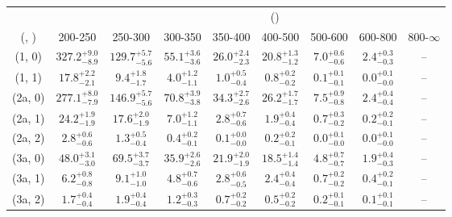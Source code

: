 \begin{table}[h!]
\tiny
\centering
{}
\begin{tabular}
{ccccccccc}
	\hline\hline
&	& \multicolumn{8}{c}{\scalht (\gev)} \\ 
	 (\njet,  \nb) & 200-250 & 250-300 & 300-350 & 350-400 & 400-500 & 500-600 & 600-800 & 800-$\infty$ \\ [0.8ex] 
\hline
	(1, 0) & $327.2^{+ 9.0 }_{- 8.9 }$ & $129.7^{+ 5.7 }_{- 5.6 }$ & $55.1^{+ 3.6 }_{- 3.6 }$ & $26.0^{+ 2.4 }_{- 2.3 }$ & $20.8^{+ 1.3 }_{- 1.2 }$ & $7.0^{+ 0.6 }_{- 0.6 }$ & $2.4^{+ 0.3 }_{- 0.3 }$ & -- \\[0.5ex] 
	(1, 1) & $17.8^{+ 2.2 }_{- 2.1 }$ & $9.4^{+ 1.8 }_{- 1.7 }$ & $4.0^{+ 1.2 }_{- 1.1 }$ & $1.0^{+ 0.5 }_{- 0.4 }$ & $0.8^{+ 0.2 }_{- 0.2 }$ & $0.1^{+ 0.1 }_{- 0.1 }$ & $0.0^{+ 0.1 }_{- 0.0 }$ & -- \\[0.5ex] 
	(2a, 0) & $277.1^{+ 8.0 }_{- 7.9 }$ & $146.9^{+ 5.7 }_{- 5.6 }$ & $70.8^{+ 3.9 }_{- 3.8 }$ & $34.3^{+ 2.7 }_{- 2.6 }$ & $26.2^{+ 1.7 }_{- 1.7 }$ & $7.5^{+ 0.9 }_{- 0.8 }$ & $2.4^{+ 0.4 }_{- 0.4 }$ & -- \\[0.5ex] 
	(2a, 1) & $24.2^{+ 1.9 }_{- 1.9 }$ & $17.6^{+ 2.0 }_{- 1.9 }$ & $7.0^{+ 1.2 }_{- 1.1 }$ & $2.8^{+ 0.7 }_{- 0.6 }$ & $1.9^{+ 0.4 }_{- 0.4 }$ & $0.7^{+ 0.3 }_{- 0.2 }$ & $0.2^{+ 0.2 }_{- 0.1 }$ & -- \\[0.5ex] 
	(2a, 2) & $2.8^{+ 0.6 }_{- 0.6 }$ & $1.3^{+ 0.5 }_{- 0.4 }$ & $0.4^{+ 0.2 }_{- 0.1 }$ & $0.1^{+ 0.0 }_{- 0.0 }$ & $0.2^{+ 0.2 }_{- 0.1 }$ & $0.0^{+ 0.1 }_{- 0.0 }$ & $0.0^{+ 0.1 }_{- 0.0 }$ & -- \\[0.5ex] 
	(3a, 0) & $48.0^{+ 3.1 }_{- 3.0 }$ & $69.5^{+ 3.7 }_{- 3.7 }$ & $35.9^{+ 2.6 }_{- 2.6 }$ & $21.9^{+ 2.0 }_{- 1.9 }$ & $18.5^{+ 1.4 }_{- 1.4 }$ & $4.8^{+ 0.7 }_{- 0.7 }$ & $1.9^{+ 0.4 }_{- 0.3 }$ & -- \\[0.5ex] 
	(3a, 1) & $6.2^{+ 0.8 }_{- 0.8 }$ & $9.1^{+ 1.0 }_{- 1.0 }$ & $4.8^{+ 0.7 }_{- 0.6 }$ & $2.8^{+ 0.6 }_{- 0.5 }$ & $2.4^{+ 0.4 }_{- 0.4 }$ & $0.7^{+ 0.2 }_{- 0.2 }$ & $0.4^{+ 0.2 }_{- 0.1 }$ & -- \\[0.5ex] 
	(3a, 2) & $1.7^{+ 0.4 }_{- 0.4 }$ & $1.9^{+ 0.4 }_{- 0.4 }$ & $1.2^{+ 0.3 }_{- 0.3 }$ & $0.7^{+ 0.2 }_{- 0.2 }$ & $0.5^{+ 0.2 }_{- 0.2 }$ & $0.2^{+ 0.1 }_{- 0.1 }$ & $0.1^{+ 0.1 }_{- 0.1 }$ & -- \\[0.5ex] 

\end{tabular}
\end{table}
